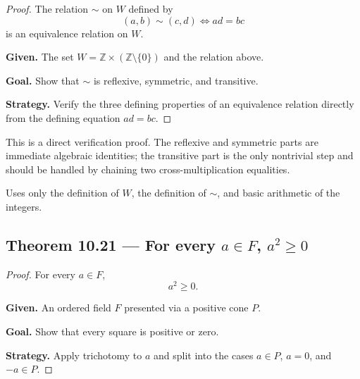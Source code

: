 \begin{proof}
\Claim The relation $\sim$ on $W$ defined by
\[
(a,b) \sim (c,d) \iff ad = bc
\]
is an equivalence relation on $W$.

\textbf{Given.} The set $W = \mathbb{Z} \times (\mathbb{Z}\setminus\{0\})$ and the relation above.

\textbf{Goal.} Show that $\sim$ is reflexive, symmetric, and transitive.

\textbf{Strategy.} Verify the three defining properties of an equivalence relation directly from the defining equation $ad=bc$.


\end{proof}

\begin{remark*}
This is a direct verification proof.  The reflexive and symmetric parts are
immediate algebraic identities; the transitive part is the only nontrivial step
and should be handled by chaining two cross-multiplication equalities.
\end{remark*}

\begin{remark*}[Dependencies]
Uses only the definition of $W$, the definition of $\sim$, and basic arithmetic
of the integers.
\end{remark*}


\subsection*{Theorem 10.21 — For every $a \in F$, $a^2 \ge 0$}
\label{prf:grep-squares-nonnegative}

\begin{proof}
\Claim For every $a \in F$,
\[
a^2 \ge 0.
\]

\textbf{Given.} An ordered field $F$ presented via a positive cone $P$.

\textbf{Goal.} Show that every square is positive or zero.

\textbf{Strategy.} Apply trichotomy to $a$ and split into the cases $a \in P$, $a=0$, and $-a \in P$.


\end{proof}

